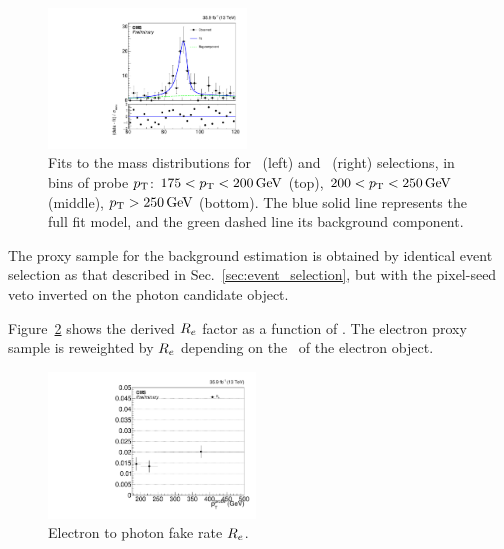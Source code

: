 \begin{figure}[htbp]
\begin{center}
    \includegraphics[width=0.47\textwidth]{Analysis/Figures/fit_data_eg_pt_250_6500.pdf}
    \caption{
      Fits to the mass distributions for \Pe\Pe\ (left) and \Pe\Pgg\ (right) selections, in bins of probe $p_{\mathrm{T}}$: $175 < p_{\mathrm{T}} < 200\,\text{Ge\hspace{-.08em}V}$ (top), $200 < p_{\mathrm{T}} < 250\,\text{Ge\hspace{-.08em}V}$ (middle), $p_{\mathrm{T}} > 250\,\text{Ge\hspace{-.08em}V}$ (bottom). 
      The blue solid line represents the full fit model, and the green dashed line its background component.
    }
    \label{fig:efake_fits}
  \end{center}
\end{figure}

The proxy sample for the background estimation is obtained by identical event selection as that described in Sec.~\ref{sec:event_selection}, but with the pixel-seed veto inverted on the photon candidate object.


Figure~\ref{fig:efake_frate} shows the derived $R_{{e}}$ factor as a function of \ETg. 
The electron proxy sample is reweighted by $R_{{e}}$ depending on the \pt\ of the electron object.

\begin{figure}[htbp]
  \begin{center}
    \includegraphics[width=0.49\textwidth]{Analysis/Figures/frate_data_ptalt.pdf} 
    \caption{
      Electron to photon fake rate $R_{{e}}$.
    }
    \label{fig:efake_frate}
  \end{center}
\end{figure}

